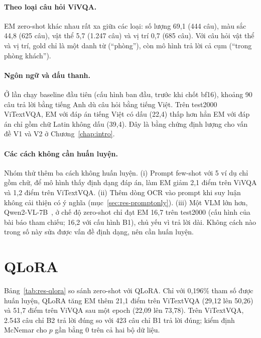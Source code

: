 \paragraph{Theo loại câu hỏi ViVQA.} EM zero-shot khác nhau rất xa giữa các loại:
số lượng 69,1 (444 câu), màu sắc 44,8 (625 câu), vật thể 5,7 (1.247 câu) và vị trí
0,7 (685 câu). Với câu hỏi vật thể và vị trí, gold chỉ là một danh từ (``phòng''),
còn mô hình trả lời cả cụm (``trong phòng khách'').

\paragraph{Ngôn ngữ và dấu thanh.} Ở lần chạy baseline đầu tiên (cấu hình ban đầu,
trước khi chốt bf16), khoảng 90 câu trả lời bằng tiếng Anh dù câu hỏi bằng tiếng
Việt. Trên test2000 ViTextVQA, EM với đáp án tiếng Việt có dấu (22,4) thấp hơn hẳn
EM với đáp án chỉ gồm chữ Latin không dấu (39,4).
Đây là bằng chứng định lượng cho vấn đề V1 và V2 ở Chương~\ref{chap:intro}.

\paragraph{Các cách không cần huấn luyện.} Nhóm thử thêm ba cách không huấn
luyện. (i) Prompt few-shot với 5 ví dụ chỉ gồm chữ, để mô hình thấy định dạng đáp
án, làm EM giảm 2,1 điểm trên ViVQA và 1,2 điểm trên ViTextVQA. (ii) Thêm dòng
OCR vào prompt khi suy luận không cải thiện có ý nghĩa
(mục~\ref{sec:res-promptonly}). (iii) Một VLM lớn hơn, Qwen2-VL-7B~\cite{wang2024qwen2vl},
ở chế độ zero-shot chỉ đạt EM 16,7 trên test2000 (cấu hình của bài báo tham chiếu; 16,2 với cấu hình B1), chủ yếu vì trả lời dài. Không
cách nào trong số này sửa được vấn đề định dạng, nên cần huấn luyện.

\section{QLoRA}
\label{sec:res-qlora}

Bảng~\ref{tab:res-qlora} so sánh zero-shot với QLoRA. Chỉ với 0,196\% tham số
được huấn luyện, QLoRA tăng EM thêm 21,1 điểm trên ViTextVQA (29,12 lên 50,26) và
51,7 điểm trên ViVQA sau một epoch (22,09 lên 73,78). Trên ViTextVQA, 2.543 câu
chỉ B2 trả lời đúng so với 423 câu chỉ B1 trả lời đúng; kiểm định McNemar cho $p$
gần bằng 0 trên cả hai bộ dữ liệu.

